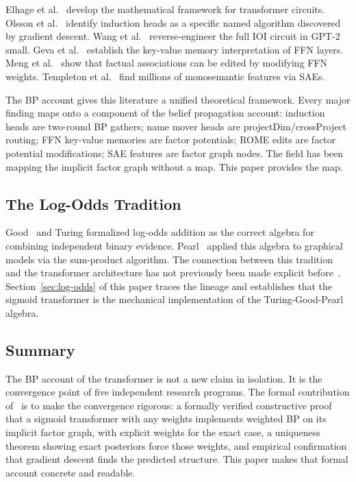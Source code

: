Elhage et al.~\cite{elhage2021mathematical} develop the mathematical framework for
transformer circuits. Olsson et al.~\cite{olsson2022induction} identify induction
heads as a specific named algorithm discovered by gradient descent. Wang et
al.~\cite{wang2022ioi} reverse-engineer the full IOI circuit in GPT-2 small.
Geva et al.~\cite{geva2021ffn} establish the key-value memory interpretation of
FFN layers. Meng et al.~\cite{meng2022rome} show that factual associations can be
edited by modifying FFN weights. Templeton et al.~\cite{templeton2024monosemanticity}
find millions of monosemantic features via SAEs.

The BP account gives this literature a unified theoretical framework. Every major
finding maps onto a component of the belief propagation account: induction heads
are two-round BP gathers; name mover heads are projectDim/crossProject routing; FFN
key-value memories are factor potentials; ROME edits are factor potential
modifications; SAE features are factor graph nodes. The field has been mapping the
implicit factor graph without a map. This paper provides the map.

\subsection*{The Log-Odds Tradition}

Good~\cite{good1950probability} and Turing formalized log-odds addition as the
correct algebra for combining independent binary evidence. Pearl~\cite{pearl1988probabilistic}
applied this algebra to graphical models via the sum-product algorithm. The
connection between this tradition and the transformer architecture has not previously
been made explicit before~\cite{coppola2026transformers}. Section~\ref{sec:log-odds}
of this paper traces the lineage and establishes that the sigmoid transformer is the
mechanical implementation of the Turing-Good-Pearl algebra.

\subsection*{Summary}

The BP account of the transformer is not a new claim in isolation. It is the
convergence point of five independent research programs. The formal
contribution of~\cite{coppola2026transformers} is to make the convergence
rigorous: a formally verified constructive proof that a sigmoid transformer with
any weights implements weighted BP on its implicit factor graph, with explicit
weights for the exact case, a uniqueness theorem showing exact posteriors force
those weights, and empirical confirmation that gradient descent finds the
predicted structure. This paper makes that formal account concrete and readable.